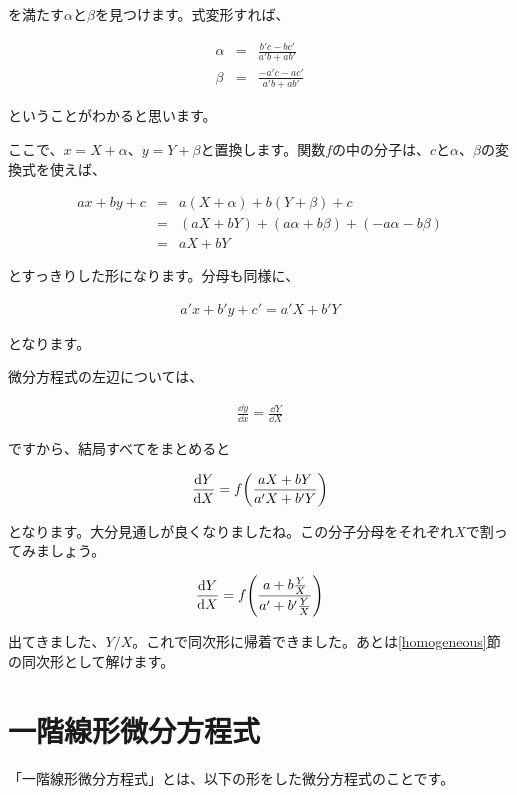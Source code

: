 \noindent
を満たす$\alpha$と$\beta$を見つけます。式変形すれば、

\begin{eqnarray}
    \alpha&=&\frac{b'c-bc'}{a'b+ab'} \\
    \beta&=&\frac{-a'c-ac'}{a'b+ab'}
\end{eqnarray}

\noindent
ということがわかると思います。

ここで、$x=X+\alpha$、$y=Y+\beta$と置換します。関数$f$の中の分子は、$c$と$\alpha$、$\beta$の変換式を使えば、

\begin{eqnarray}
    ax+by+c&=&a(X+\alpha)+b(Y+\beta)+c \nonumber \\
    &=&(aX+bY)+(a\alpha+b\beta)+(-a\alpha-b\beta) \nonumber \\
    &=&aX+bY
\end{eqnarray}

\noindent
とすっきりした形になります。分母も同様に、

\begin{eqnarray}
    a'x+b'y+c'=a'X+b'Y
\end{eqnarray}

\noindent
となります。

微分方程式の左辺については、

\begin{eqnarray}
    \frac{\dd y}{\dd x}=\frac{\dd Y}{\dd X}
\end{eqnarray}

\noindent
ですから、結局すべてをまとめると

\begin{eqnarray}
    \frac{\dd Y}{\dd X}=f\pqty{\frac{aX+bY}{a'X+b'Y}}
\end{eqnarray}

\noindent
となります。大分見通しが良くなりましたね。この分子分母をそれぞれ$X$で割ってみましょう。

\begin{eqnarray}
    \frac{\dd Y}{\dd X}=f\pqty{\frac{a+b\frac{Y}{X}}{a'+b'\frac{Y}{X}}}
\end{eqnarray}

出てきました、$Y/X$。これで同次形に帰着できました。あとは\ref{homogeneous}節の同次形として解けます。







\section{一階線形微分方程式}
\label{first-order}
「一階線形微分方程式」とは、以下の形をした微分方程式のことです。

